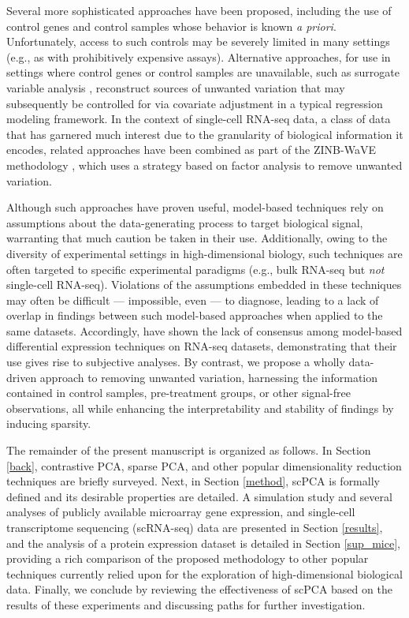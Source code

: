 Several more sophisticated approaches have been proposed, including the use of control genes \cite{gagnon2012using, risso2014normalization} and control samples \cite{gagnon2013removing} whose behavior is known \textit{a priori}. Unfortunately, access to such controls may be severely limited in many settings (e.g., as with prohibitively expensive assays). Alternative approaches, for use in settings where control genes or control samples are unavailable, such as surrogate variable analysis \cite{leek2007capturing}, reconstruct sources of unwanted variation that may subsequently be controlled for via covariate adjustment in a typical regression modeling framework. In the context of single-cell RNA-seq data, a class of data that has garnered much interest due to the granularity of biological information it encodes, related approaches have been combined as part of the ZINB-WaVE methodology \cite{risso2017zinb}, which uses a strategy based on factor analysis to remove unwanted variation.

Although such approaches have proven useful, model-based techniques rely on assumptions about the data-generating process to target biological signal, warranting that much caution be taken in their use. Additionally, owing to the diversity of experimental settings in high-dimensional biology, such techniques are often targeted to specific experimental paradigms (e.g., bulk RNA-seq but \textit{not} single-cell RNA-seq). Violations of the assumptions embedded in these techniques may often be difficult --- impossible, even --- to diagnose, leading to a lack of overlap in findings between such model-based approaches when applied to the same datasets. Accordingly, \citet{zhang2014} have shown the lack of consensus among model-based differential expression techniques on RNA-seq datasets, demonstrating that their use gives rise to subjective analyses. By contrast, we propose a wholly data-driven approach to removing unwanted variation, harnessing the information contained in control samples, pre-treatment groups, or other signal-free observations, all while enhancing the interpretability and stability of findings by inducing sparsity.

The remainder of the present manuscript is organized as follows. In Section \ref{back}, contrastive PCA, sparse PCA, and other popular dimensionality reduction techniques are briefly surveyed. Next, in Section \ref{method}, scPCA is formally defined and its desirable properties are detailed. A simulation study and several analyses of publicly available  microarray gene expression, and single-cell transcriptome sequencing (scRNA-seq) data are presented in Section \ref{results}, and the analysis of a protein expression dataset is detailed in Section \ref{sup_mice}, providing a rich comparison of the proposed methodology to other popular techniques currently relied upon for the exploration of high-dimensional biological data. Finally, we conclude by reviewing the effectiveness of scPCA based on the results of these experiments and discussing paths for further investigation. 

